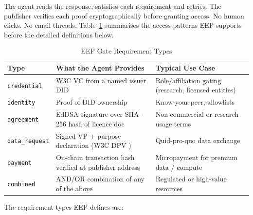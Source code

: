 \documentclass[12pt,a4paper]{article}
\begin{document}
The agent reads the response, satisfies each requirement and retries. The publisher verifies each proof cryptographically before granting access. No human clicks. No email threads. Table~\ref{tab:gates} summarises the access patterns EEP supports before the detailed definitions below.

\begin{table}[h!]
\centering
\caption{EEP Gate Requirement Types}
\label{tab:gates}
\renewcommand{\arraystretch}{1.3}
\begin{tabular}{|p{2.3cm}|p{5.5cm}|p{7.0cm}|}
\hline
\textbf{Type} & \textbf{What the Agent Provides} & \textbf{Typical Use Case} \\
\hline
\texttt{credential} & W3C VC \cite{ref10} from a named issuer DID & Role/affiliation gating (research, licensed entities) \\
\hline
\texttt{identity} & Proof of DID ownership & Know-your-peer; allowlists \\
\hline
\texttt{agreement} & EdDSA signature over SHA-256 hash of licence doc & Non-commercial or research usage terms \\
\hline
\texttt{data\_request} & Signed VP + purpose declaration (W3C DPV \cite{ref14}) & Quid-pro-quo data exchange \\
\hline
\texttt{payment} & On-chain transaction hash verified at publisher address & Micropayment for premium data / compute \\
\hline
\texttt{combined} & AND/OR combination of any of the above & Regulated or high-value resources \\
\hline
\end{tabular}
\end{table}

The requirement types EEP defines are:
\end{document}
